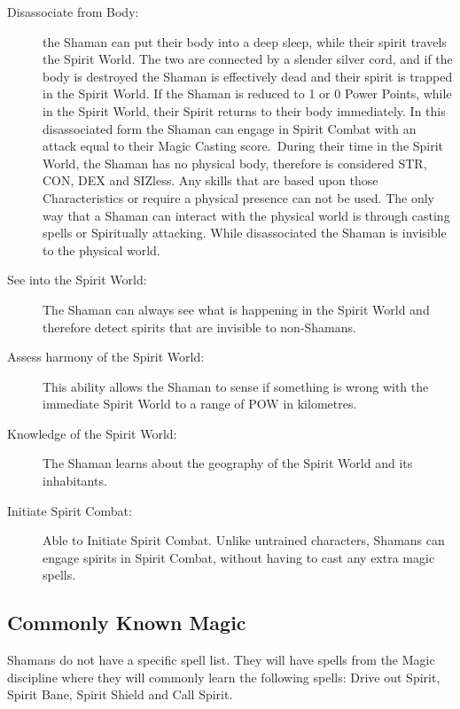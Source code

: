 \begin{description}
\item[Disassociate from Body:] the Shaman can put their body into a deep sleep, while their spirit travels the Spirit World. The two are connected by a slender silver cord, and if the body is destroyed the Shaman is effectively dead and their spirit is trapped in the Spirit World. If the Shaman is reduced to 1 or 0 Power Points, while in the Spirit World, their Spirit returns to their body immediately. In this disassociated form the Shaman can engage in Spirit Combat with an attack equal to their Magic Casting score. During their time in the Spirit World, the Shaman has no physical body, therefore is considered STR, CON, DEX and SIZless. Any skills that are based upon those Characteristics or require a physical presence can not be used. The only way that a Shaman can interact with the physical world is through casting spells or Spiritually attacking. While disassociated the Shaman is invisible to the physical world.

\item[See into the Spirit World:] The Shaman can always see what is happening in the Spirit World and therefore detect spirits that are invisible to non-Shamans.

\item[Assess harmony of the Spirit World:] This ability allows the Shaman to sense if something is wrong with the immediate Spirit World to a range of POW in kilometres. 

\item[Knowledge of the Spirit World:] The Shaman learns about the geography of the Spirit World and its inhabitants.

\item[Initiate Spirit Combat:] Able to Initiate Spirit Combat. Unlike untrained characters, Shamans can engage spirits in Spirit Combat, without having to cast any extra magic spells.
\end{description}


\subsection{Commonly Known Magic}
Shamans do not have a specific spell list. They will have spells from the Magic discipline where they will commonly learn the following spells: Drive out Spirit, Spirit Bane, Spirit Shield and Call Spirit.


